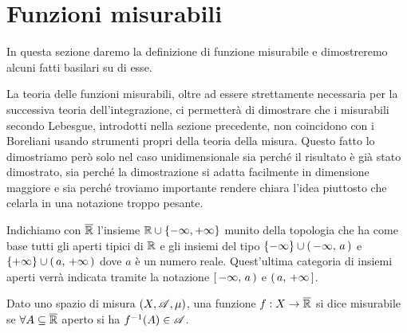 \section{Funzioni misurabili}
In questa sezione daremo la definizione di funzione misurabile e dimostreremo alcuni fatti basilari su di esse.

La teoria delle funzioni misurabili, oltre ad essere strettamente necessaria per la successiva teoria dell'integrazione, ci permetterà di dimostrare che i misurabili secondo Lebesgue, introdotti nella sezione precedente, non coincidono con i Boreliani usando strumenti propri della teoria della misura.
Questo fatto lo dimostriamo però solo nel caso unidimensionale sia perché il risultato è già stato dimostrato, sia perché la dimostrazione si adatta facilmente in dimensione maggiore e sia perché troviamo importante rendere chiara l'idea piuttosto che celarla in una notazione troppo pesante.

\begin{definition}
	Indichiamo con $\overline{\mathbb R}$ l'insieme $\mathbb R\cup\{-\infty,+\infty\}$ munito della topologia che ha come base tutti gli aperti tipici di $\mathbb R$ e gli insiemi del tipo $\{-\infty\}\cup\left(\,-\infty,\,a\,\right)$ e $\{+\infty\}\cup\left(\,a,\,+\infty\,\right)$ dove $a$ è un numero reale. 
	Quest'ultima categoria di insiemi aperti verrà indicata tramite la notazione $\left[\,-\infty,\,a\,\right)$ e $\left(\,a,\,+\infty\,\right]$.
\end{definition}


\begin{definition}
	Dato uno spazio di misura $(X,\mathscr A,\mu)$, una funzione $f:X\rightarrow \overline{\mathbb R}$ si dice misurabile se
	$\forall A \subseteq \overline{\mathbb R}$ aperto si ha $f^{-1}(A)\in \mathscr A$.
\end{definition}

